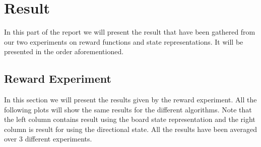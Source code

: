 \documentclass[result.tex]{subfiles}
\begin{document}
    \section*{\centering Result}

    In this part of the report we will present the result that have been gathered from our two experiments on reward functions and state representations. It will be presented in the order aforementioned.

    \subsection*{Reward Experiment}

    In this section we will present the results given by the reward experiment. All the following plots will show the same results for the different algorithms. Note that the left column contains result using the board state representation and the right column is result for using the directional state. All the results have been averaged over 3 different experiments.
\end{document}
